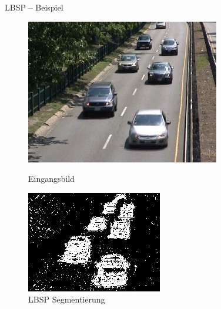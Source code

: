 \documentclass[hyperref={pdfpagelabels=false}]{beamer}
\begin{document}
\begin{frame}[t]{LBSP -- Beispiel}
	\vspace{1.65em}
	\begin{figure}
		\centering
		\begin{minipage}{0.45\linewidth}
			\includegraphics[width=1\linewidth]{Abbildungen/Eingang3.jpg}
			\caption*{Eingangsbild}
		\end{minipage}
		\begin{minipage}{0.45\linewidth}
			\includegraphics[width=1\linewidth]{Abbildungen/lbsp_decision.jpg}
			\caption*{LBSP Segmentierung}
		\end{minipage}
	\end{figure}
\end{frame}
\end{document}
